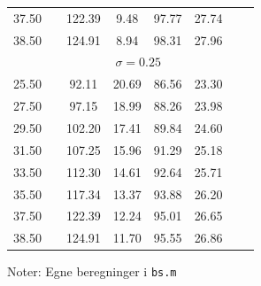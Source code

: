 \documentclass{article}
\begin{document}
\begin{appendices}
\begin{table}[h]
{\begin{tabularx}{\linewidth}{cXcccccr}
         37.50  &&      122.39   &       9.48  &       97.77 &        27.74\\
         38.50  &&      124.91   &       8.94  &       98.31 &        27.96\\
			\hline 
		&\multicolumn{5}{c}{$\sigma=0.25$} \\
		\hline 
         25.50  &&       92.11  &       20.69   &      86.56  &       23.30\\
         27.50  &&       97.15  &       18.99   &      88.26  &       23.98\\
         29.50  &&      102.20  &       17.41   &      89.84  &       24.60\\
         31.50  &&      107.25  &       15.96   &      91.29  &       25.18\\
         33.50  &&      112.30  &       14.61   &      92.64  &       25.71\\
         35.50  &&      117.34  &       13.37   &      93.88   &      26.20\\
         37.50  &&      122.39  &       12.24   &      95.01  &       26.65\\
         38.50  &&      124.91  &       11.70   &      95.55  &       26.86\\
	\bottomrule[1pt]
	\end{tabularx}}
	\begin{minipage}{\linewidth}
		\footnotesize{Noter: Egne beregninger i \texttt{bs.m} }
	\end{minipage}
\end{table}	


\end{appendices}
\end{document}
